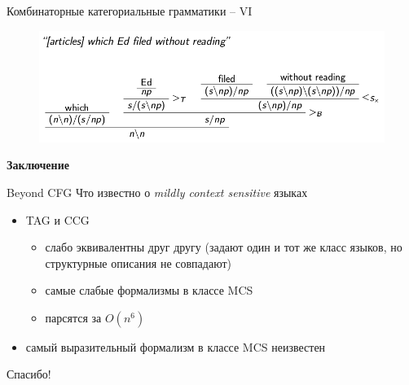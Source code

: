 \documentclass{beamer}
\begin{document}
\begin{frame}{Комбинаторные категориальные грамматики -- VI}
\begin{center}
	\begin{figure}[H]
		\includegraphics[scale=0.4]{ccg2.png} 
	\end{figure}
\end{center}
\end{frame}

\begin{frame}{}
\begin{center}
	\textbf{Заключение}
\end{center}
\end{frame}

\begin{frame}{Beyond CFG}
Что известно о \textit{mildly context sensitive} языках\\
\bigskip 
\begin{itemize}
    \item TAG и CCG
        \begin{itemize}
            \item слабо эквивалентны друг другу (задают один и тот же класс языков, но структурные описания не совпадают)
            \item самые слабые формализмы в классе MCS
            \item парсятся за $O(n^6)$
        \end{itemize}
    \item самый выразительный формализм в классе MCS неизвестен
\end{itemize}
\end{frame}

\begin{frame}{}
    \thispagestyle{empty}
    \begin{center}
        {\large Спасибо!}
    \end{center}
\end{frame}
\end{document}

